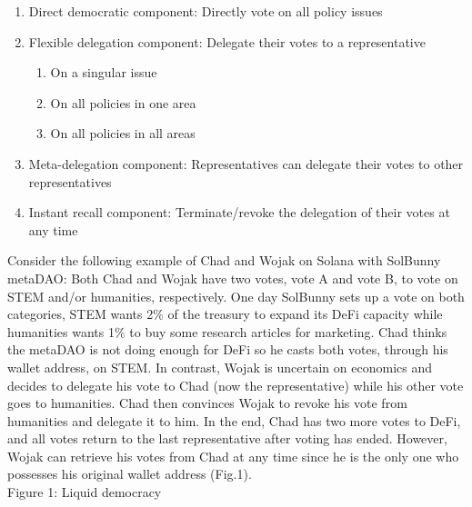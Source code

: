 \documentclass[12pt]{article}
\begin{document}
\begin{enumerate}

\item Direct democratic component: Directly vote on all policy issues

\item Flexible delegation component: Delegate their votes to a representative

\begin{enumerate}
    \item On a singular issue
    \item On all policies in one area
    \item On all policies in all areas
  \end{enumerate}

\item Meta-delegation component: Representatives can delegate their votes to other representatives

\item Instant recall component: Terminate/revoke the delegation of their votes at any time

\end{enumerate}

Consider the following example of Chad and Wojak on Solana with SolBunny metaDAO: Both Chad and Wojak have two votes, vote A and vote B, to vote on STEM and/or humanities, respectively. One day SolBunny sets up a vote on both categories, STEM wants 2$\%$ of the treasury to expand its DeFi capacity while humanities wants 1$\%$ to buy some research articles for marketing. Chad thinks the metaDAO is not doing enough for DeFi so he casts both votes, through his wallet address, on STEM. In contrast, Wojak is uncertain on economics and decides to delegate his vote to Chad (now the representative) while his other vote goes to humanities. Chad then convinces Wojak to revoke his vote from humanities and delegate it to him. In the end, Chad has two more votes to DeFi, and all votes return to the last representative after voting has ended. However, Wojak can retrieve his votes from Chad at any time since he is the only one who possesses his original wallet address (Fig.1). \\

Figure 1: Liquid democracy\\
\end{document}
